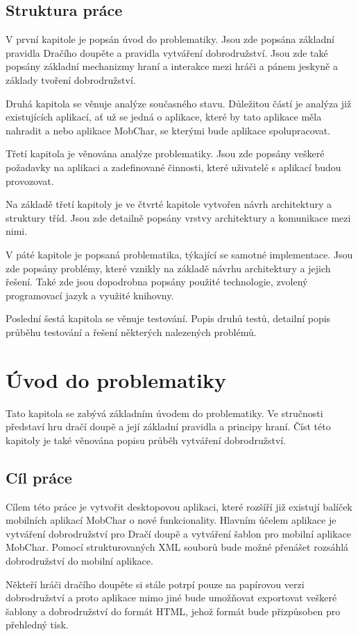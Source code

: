 \documentclass[thesis=B,czech]{resources/FITthesis}[2012/06/26]
\begin{document}
\begin{introduction}
\section*{Struktura práce}
V první kapitole je popsán úvod do problematiky. Jsou zde popsána základní pravidla Dračího doupěte a pravidla vytváření dobrodružství. Jsou zde také popsány základní mechanizmy hraní a interakce mezi hráči a pánem jeskyně a základy tvoření dobrodružství. \par

Druhá kapitola se věnuje analýze současného stavu. Důležitou částí je analýza již existujících aplikací, ať už se jedná o aplikace, které by tato aplikace měla nahradit a nebo aplikace MobChar, se kterými bude aplikace spolupracovat. \par

Třetí kapitola je věnována analýze problematiky. Jsou zde popsány veškeré požadavky na aplikaci a zadefinované činnosti, které uživatelé s aplikací budou provozovat. \par

Na základě třetí kapitoly je ve čtvrté kapitole vytvořen návrh architektury a struktury tříd. Jsou zde detailně popsány vrstvy architektury a komunikace mezi nimi. \par

V páté kapitole je popsaná problematika, týkající se samotné implementace. Jsou zde popsány problémy, které vznikly na základě návrhu architektury a jejich řešení. Také zde jsou dopodrobna popsány použité technologie, zvolený programovací jazyk a využité knihovny. \par

Poslední šestá kapitola se věnuje testování. Popis druhů testů, detailní popis průběhu testování a řešení některých nalezených problémů.


\end{introduction}

\chapter{Úvod do problematiky}
Tato kapitola se zabývá základním úvodem do problematiky. Ve stručnosti představí hru dračí doupě a její základní pravidla a principy hraní. Číst této kapitoly je také věnována popisu průběh vytváření dobrodružství.
	\section{Cíl práce}
Cílem této práce je vytvořit desktopovou aplikaci, které rozšíří již existují balíček mobilních aplikací MobChar o nové funkcionality. Hlavním účelem aplikace je vytváření dobrodružství pro Dračí doupě a vytváření šablon pro mobilní aplikace MobChar. Pomocí strukturovaných XML souborů bude možné přenášet rozsáhlá dobrodružství do mobilní aplikace. \par
Někteří hráči dračího doupěte si stále potrpí pouze na papírovou verzi dobrodružství a proto aplikace mimo jiné bude umožňovat exportovat veškeré šablony a dobrodružství do formát HTML, jehož formát bude přizpůsoben pro přehledný tisk. 
\end{document}
